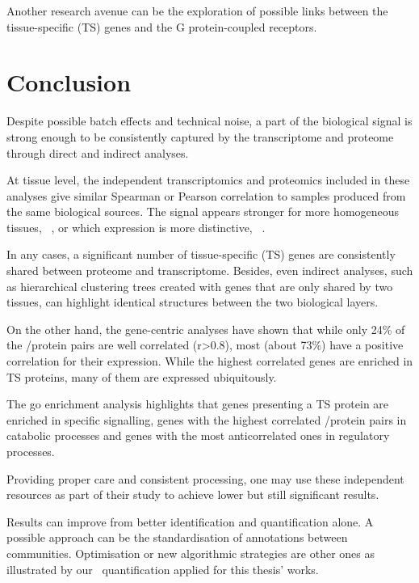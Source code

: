 Another research avenue can be the exploration of possible links
between the tissue-specific (\gls{TS}) genes and the G protein-coupled receptors.\mybr\

\section{Conclusion}

Despite possible batch effects and technical noise,
a part of the biological signal is strong enough
to be consistently captured by the transcriptome and proteome
through direct and indirect analyses.\mybr\

At tissue level,
the independent transcriptomics and proteomics included in these analyses
give similar Spearman or Pearson correlation
to samples produced from the same biological sources.
The signal appears stronger for more homogeneous tissues, \eg\ \liver,
or which expression is more distinctive, \eg\ \testis{}.\mybr\

In any cases, a significant number of tissue-specific (\gls{TS}) genes
are consistently shared between proteome and transcriptome.
Besides, even indirect analyses,
such as hierarchical clustering trees
created with genes that are only shared by two tissues,
can highlight identical structures between the two biological layers.\mybr\

On the other hand, the gene-centric analyses have shown that
while only 24\% of the \mRNA/protein pairs are well correlated (r>$0.8$),
most (about 73\%) have a positive correlation for their expression.
While the highest correlated genes are enriched in \gls{TS} proteins,
many of them are expressed ubiquitously.\mybr\

The \gls{go} enrichment analysis highlights that
genes presenting a \gls{TS} protein are enriched in specific signalling,
genes with the highest correlated \mRNA/protein pairs in catabolic processes
and genes with the most anticorrelated ones in regulatory processes.\mybr\

Providing proper care and consistent processing,
one may use these independent resources as part of their study
to achieve lower but still significant results.\mybr\

Results can improve from better identification and quantification alone.
A possible approach can be the standardisation of annotations between communities.
Optimisation or new algorithmic strategies are other ones
as illustrated by our \PPKM\ quantification applied for this thesis' works.\mybr\
